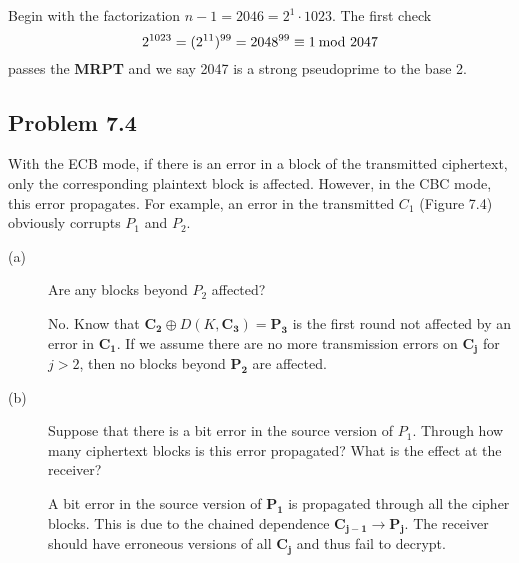 \documentclass[../hw_sols.tex]{subfiles}
\begin{document}
\begin{solution}
Begin with the factorization $n - 1 = 2046 = 2^1 \cdot 1023$. The first check 
	\[ 2^{1023} = (2^{11})^{99} = 2048^{99} \equiv 1 \tmod{2047} \]
passes the \textbf{MRPT} and we say 2047 is a strong pseudoprime to the 
base 2.
\end{solution}


\newpage



\subsection*{Problem 7.4}

With the ECB mode, if there is an error in a block of the transmitted 
ciphertext, only the corresponding plaintext block is affected. However, in 
the CBC mode, this error propagates. For example, an error in the transmitted 
$C_1$ (Figure 7.4) obviously corrupts $P_1$ and $P_2$.

\begin{description}

\item[(a)] Are any blocks beyond $P_2$ affected?

\begin{solution}
No. Know that 
$\mathbf{C_2} \oplus D(K, \mathbf{C_3}) = \mathbf{P_3}$	
is the first round not affected by an error in $\mathbf{C_1}$. If we assume 
there are no more transmission errors on $\mathbf{C_j}$ for $j > 2$, then no 
blocks beyond $\mathbf{P_2}$ are affected.
\end{solution}

\item[(b)] Suppose that there is a bit error in the source version of $P_1$. 
Through how many ciphertext blocks is this error propagated? What is the 
effect at the receiver?

\begin{solution}
A bit error in the source version of $\mathbf{P_1}$ is propagated through all 
the cipher blocks. This is due to the chained dependence 
$\mathbf{C_{j-1}} \to \mathbf{P_j}$. The receiver should have erroneous 
versions of all $\mathbf{C_j}$ and thus fail to decrypt.
\end{solution}

\end{description}
\end{document}
